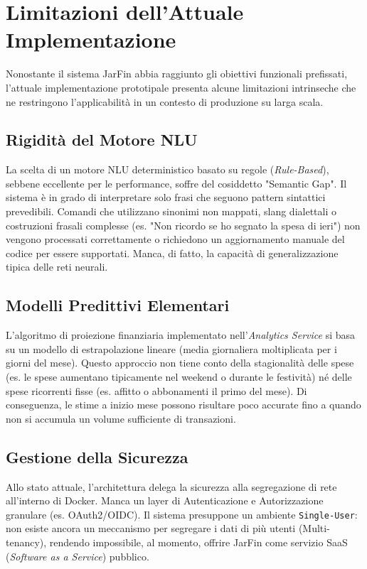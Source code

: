 \section{Limitazioni dell'Attuale Implementazione}

Nonostante il sistema JarFin abbia raggiunto gli obiettivi funzionali prefissati, l'attuale implementazione prototipale presenta alcune limitazioni intrinseche che ne restringono l'applicabilità in un contesto di produzione su larga scala.

\subsection{Rigidità del Motore NLU}
La scelta di un motore NLU deterministico basato su regole (\textit{Rule-Based}), sebbene eccellente per le performance, soffre del cosiddetto "Semantic Gap".
Il sistema è in grado di interpretare solo frasi che seguono pattern sintattici prevedibili. Comandi che utilizzano sinonimi non mappati, slang dialettali o costruzioni frasali complesse (es. "Non ricordo se ho segnato la spesa di ieri") non vengono processati correttamente o richiedono un aggiornamento manuale del codice per essere supportati. Manca, di fatto, la capacità di generalizzazione tipica delle reti neurali.

\subsection{Modelli Predittivi Elementari}
L'algoritmo di proiezione finanziaria implementato nell'\textit{Analytics Service} si basa su un modello di estrapolazione lineare (media giornaliera moltiplicata per i giorni del mese).
Questo approccio non tiene conto della stagionalità delle spese (es. le spese aumentano tipicamente nel weekend o durante le festività) né delle spese ricorrenti fisse (es. affitto o abbonamenti il primo del mese). Di conseguenza, le stime a inizio mese possono risultare poco accurate fino a quando non si accumula un volume sufficiente di transazioni.

\subsection{Gestione della Sicurezza}
Allo stato attuale, l'architettura delega la sicurezza alla segregazione di rete all'interno di Docker. Manca un layer di Autenticazione e Autorizzazione granulare (es. OAuth2/OIDC).
Il sistema presuppone un ambiente \texttt{Single-User}: non esiste ancora un meccanismo per segregare i dati di più utenti (Multi-tenancy), rendendo impossibile, al momento, offrire JarFin come servizio SaaS (\textit{Software as a Service}) pubblico.

